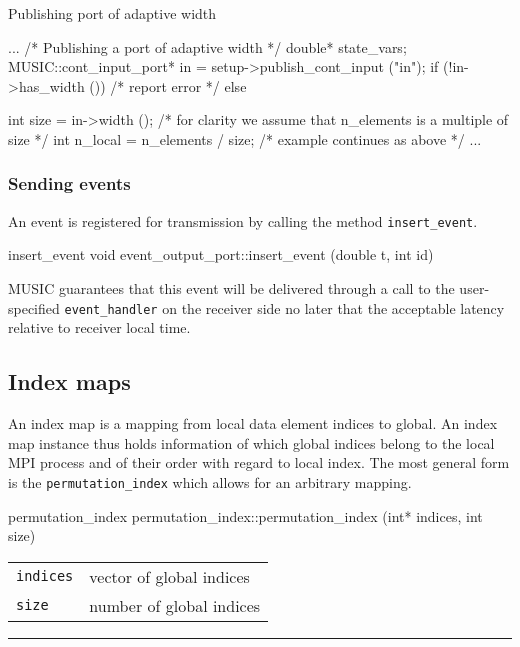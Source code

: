 \documentclass[a4paper]{report}
\makeatletter
\newenvironment{parameters}%
{\begin{tabular}{@{\hspace{2em}}lp{0.6\textwidth}}}%
{\end{tabular}\par\vspace{1mm}\par\hrule\par\vspace{5mm}}
\makeatother
\begin{document}
\begin{code}{Publishing port of adaptive width\label{code:adaptivewidth}}
{
  ...
  /* Publishing a port of adaptive width */
  double* state_vars;
  MUSIC::cont_input_port* in = setup->publish_cont_input ("in");
  if (!in->has_width ())
    /* report error */
  else
    {
      int size = in->width ();
      /* for clarity we assume that n_elements is a multiple of size */
      int n_local = n_elements / size;
      /* example continues as above */
      ...
      
    }
}
\end{code}

\subsubsection{Sending events}

An event is registered for transmission by calling the method
\lstinline|insert_event|.

\begin{head}{insert_event}
  void event_output_port::insert_event (double t, int id)
\end{head}

MUSIC guarantees that this event will be delivered through a call to
the user-specified \lstinline|event_handler| on the receiver side no
later that the acceptable latency relative to receiver local time.

\subsection{Index maps}

An index map is a mapping from local data element indices to
global. An index map instance thus holds information of which global
indices belong to the local MPI process and of their order with regard
to local index.  The most general form is the
\lstinline|permutation_index| which allows for an arbitrary mapping.

\begin{head}{permutation_index}
  permutation_index::permutation_index (int* indices, int size)
\end{head}
\begin{parameters}
  \lstinline|indices| & vector of global indices \\
  \lstinline|size| & number of global indices \\
\end{parameters}
\end{document}
